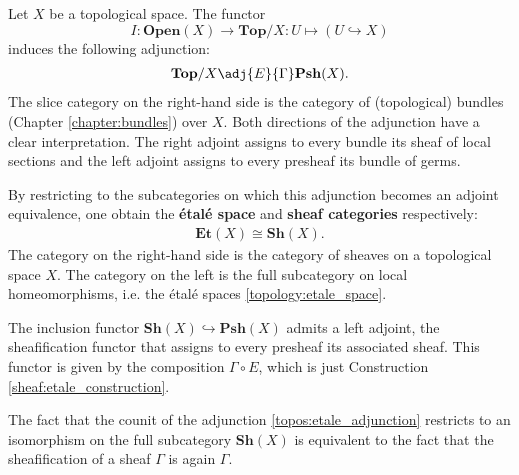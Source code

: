     \begin{construct}\label{topos:etale_adjunction}
        Let $X$ be a topological space. The functor \[I:\mathbf{Open}(X)\rightarrow\mathbf{Top}/X:U\mapsto(U\hookrightarrow X)\] induces the following adjunction:
        \begin{gather}
            \mathbf{Top}/X\adj{E}{\Gamma}\mathbf{Psh}(X).
        \end{gather}
        The slice category on the right-hand side is the category of (topological) bundles (Chapter \ref{chapter:bundles}) over $X$. Both directions of the adjunction have a clear interpretation. The right adjoint assigns to every bundle its sheaf of local sections and the left adjoint assigns to every presheaf its bundle of germs.

        By restricting to the subcategories on which this adjunction becomes an adjoint equivalence, one obtain the \textbf{\'etal\'e space} and \textbf{sheaf categories} respectively:
        \begin{gather}
            \mathbf{Et}(X)\cong\mathbf{Sh}(X).
        \end{gather}
        The category on the right-hand side is the category of sheaves on a topological space $X$. The category on the left is the full subcategory on local homeomorphisms, i.e. the \'etal\'e spaces \ref{topology:etale_space}.
    \end{construct}

    \begin{property}
        The inclusion functor $\mathbf{Sh}(X)\hookrightarrow\mathbf{Psh}(X)$ admits a left adjoint, the sheafification functor that assigns to every presheaf its associated sheaf. This functor is given by the composition $\Gamma\circ E$, which is just Construction \ref{sheaf:etale_construction}.

        The fact that the counit of the adjunction \ref{topos:etale_adjunction} restricts to an isomorphism on the full subcategory $\mathbf{Sh}(X)$ is equivalent to the fact that the sheafification of a sheaf $\Gamma$ is again $\Gamma$.
    \end{property}


